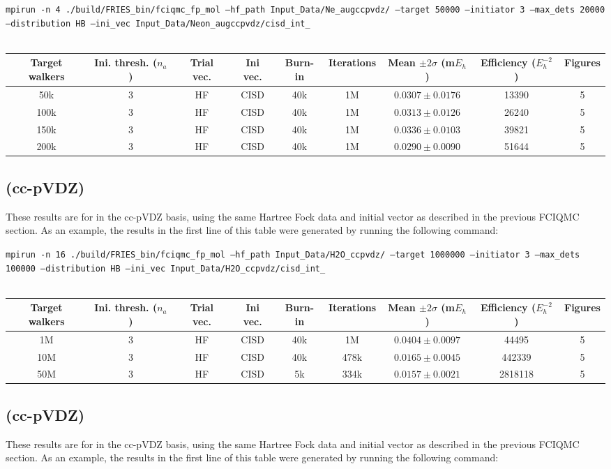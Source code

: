 \documentclass[12pt, landscape]{article}
\begin{document}
\texttt{mpirun -n 4 ./build/FRIES\_bin/fciqmc\_fp\_mol --hf\_path Input\_Data/Ne\_augccpvdz/ --target 50000 --initiator 3 --max\_dets 20000 --distribution HB --ini\_vec Input\_Data/Neon\_augccpvdz/cisd\_int\_}
\\~\\
\begin{tabular}{c|c|c|c|c|c|c|c|c}
Target walkers & Ini. thresh. ($n_a$) & Trial vec. & Ini vec. & Burn-in & Iterations & Mean $\pm 2 \sigma$ (m$E_h$) & Efficiency ($E_h^{-2}$) & Figures \\ \hline
50k & 3 & HF & CISD & 40k & 1M & $0.0307 \pm 0.0176$ & 13390 & 5 \\
100k & 3 & HF & CISD & 40k & 1M & $0.0313 \pm 0.0126$ & 26240 & 5 \\
150k & 3 & HF & CISD & 40k & 1M & $0.0336 \pm 0.0103$ & 39821 & 5 \\
200k & 3 & HF & CISD & 40k & 1M & $0.0290 \pm 0.0090$ & 51644 & 5 \\
\end{tabular}


\subsection*{ (cc-pVDZ)}
These results are for  in the cc-pVDZ basis, using the same Hartree Fock data and initial vector as described in the previous FCIQMC section. As an example, the results in the first line of this table were generated by running the following command:

\texttt{mpirun -n 16 ./build/FRIES\_bin/fciqmc\_fp\_mol --hf\_path Input\_Data/H2O\_ccpvdz/ --target 1000000 --initiator 3 --max\_dets 100000 --distribution HB --ini\_vec Input\_Data/H2O\_ccpvdz/cisd\_int\_}
\\~\\
\begin{tabular}{c|c|c|c|c|c|c|c|c}
Target walkers & Ini. thresh. ($n_a$) & Trial vec. & Ini vec. & Burn-in & Iterations & Mean $\pm 2 \sigma$ (m$E_h$) & Efficiency ($E_h^{-2}$) & Figures \\ \hline
1M & 3 & HF & CISD & 40k & 1M & $0.0404 \pm 0.0097$ & 44495 & 5\\
10M & 3 & HF & CISD & 40k & 478k & $0.0165 \pm 0.0045$ & 442339 & 5\\
50M & 3 & HF & CISD & 5k & 334k & $0.0157 \pm 0.0021$ & 2818118 & 5 \\
\end{tabular}

\subsection*{ (cc-pVDZ)}
These results are for  in the cc-pVDZ basis, using the same Hartree Fock data and initial vector as described in the previous FCIQMC section. As an example, the results in the first line of this table were generated by running the following command:
\end{document}
